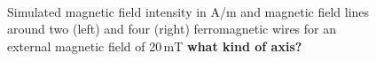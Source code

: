 \begin{figure}
            \begin{subfigure}{0.49\textwidth}
                  \flushleft
          \end{subfigure}\hfill
        \begin{subfigure}{0.49\textwidth}
                \flushright
        \end{subfigure}
        \\
        
        \caption[Simulated magnetic field intensity around two and four wires]{Simulated magnetic field intensity in A/m and magnetic field lines around two (left) and four (right) ferromagnetic wires for an external magnetic field of 20\,mT \textbf{what kind of axis?}}
        \label{fig:tw_fw_mag_field}
  \end{figure}

